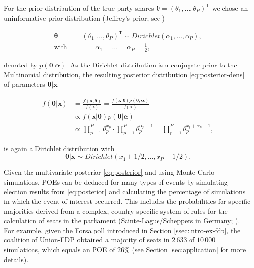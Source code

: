 \documentclass[smallextended]{svjour3}      %
\newcommand{\T}{\mathrm{\scriptscriptstyle T}}
\begin{document}
For the prior distribution of the true party shares $\boldsymbol{\theta}=(\theta_1,\ldots, \theta_P)^\T$
we chose an uninformative prior distribution
(Jeffrey's prior; see \citet{gelman_2013})

\begin{equation}\label{eq:prior}
\begin{aligned}
\boldsymbol{\theta} &= (\theta_1,\ldots,\theta_P)^\T \sim Dirichlet(\alpha_1,\ldots,\alpha_P), \\
\text{with} &\ \ \ \ \ \ \ \ \ \ \ \ \ \ \ \alpha_1 = \ldots = \alpha_P = \frac{1}{2},
\end{aligned}
\end{equation}

denoted by $p(\boldsymbol{\theta}|\boldsymbol{\alpha})$.
As the Dirichlet distribution is a conjugate prior to the Multinomial distribution,
the resulting posterior distribution \eqref{eq:posterior-dens}  of parameters $\boldsymbol{\theta}|\mathbf{x}$

\begin{align}
f(\boldsymbol{\theta}|\mathbf{x})
  & = \frac{f(\mathbf{x}, \boldsymbol{\theta})}{f(\mathbf{x})}
    = \frac{f(\mathbf{x}|\boldsymbol{\theta})p(\boldsymbol{\theta}, \boldsymbol{\alpha})}{f(\mathbf{x})}\label{eq:posterior-dens}\\
  & \propto f(\mathbf{x}|\boldsymbol{\theta})p(\boldsymbol{\theta}|\boldsymbol{\alpha})\\
  & \propto \prod_{p=1}^{P}\theta_p^{x_p}\cdot \prod_{p=1}^{P}\theta_p^{\alpha_{p}-1} = \prod_{p=1}^{P}\theta_p^{x_p + \alpha_p-1},
\end{align}

is again a Dirichlet distribution with
\begin{equation}\label{eq:posterior}
\boldsymbol{\theta}|\mathbf{x} \sim Dirichlet(x_1 + 1/2,\ldots, x_P + 1/2).
\end{equation}

Given the multivariate posterior \eqref{eq:posterior} and using Monte Carlo
simulations, POEs can be deduced for many types of events by simulating
election results from \eqref{eq:posterior} and calculating the percentage of
simulations in which the event of interest occurred. This includes the
probabilities for specific majorities derived from a complex, country-specific
system of rules for the calculation of seats in the parliament
(Sainte-Lague/Scheppers in Germany; \citet{grofman_2003}). For example, given the
Forsa poll introduced in Section \ref{ssec:intro-ex-fdp}, the coalition of Union-FDP
obtained a majority of seats in $2\,633$ of $10\,000$ simulations, which equals
an POE of $26\%$ (see Section \ref{sec:application} for more details).\\
\end{document}

